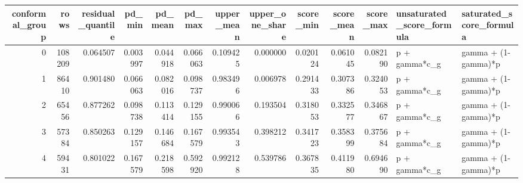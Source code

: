 \begin{tabular}{rrrrrrrrrrrll}
\toprule
conformal\_group & rows & residual\_quantile & pd\_min & pd\_mean & pd\_max & upper\_mean & upper\_one\_share & score\_min & score\_mean & score\_max & unsaturated\_score\_formula & saturated\_score\_formula \\
\midrule
0 & 108209 & 0.064507 & 0.003997 & 0.044918 & 0.066063 & 0.109425 & 0.000000 & 0.020124 & 0.061045 & 0.082190 & p + gamma*c\_g & gamma + (1-gamma)*p \\
1 & 86410 & 0.901480 & 0.066063 & 0.082016 & 0.098737 & 0.983496 & 0.006978 & 0.291433 & 0.307386 & 0.324053 & p + gamma*c\_g & gamma + (1-gamma)*p \\
2 & 65456 & 0.877262 & 0.098738 & 0.113414 & 0.129155 & 0.990066 & 0.193504 & 0.318053 & 0.332577 & 0.346867 & p + gamma*c\_g & gamma + (1-gamma)*p \\
3 & 57384 & 0.850263 & 0.129157 & 0.146684 & 0.167579 & 0.993543 & 0.398212 & 0.341723 & 0.358399 & 0.375684 & p + gamma*c\_g & gamma + (1-gamma)*p \\
4 & 59431 & 0.801022 & 0.167579 & 0.218598 & 0.592920 & 0.992128 & 0.539786 & 0.367835 & 0.411980 & 0.694690 & p + gamma*c\_g & gamma + (1-gamma)*p \\
\bottomrule
\end{tabular}
